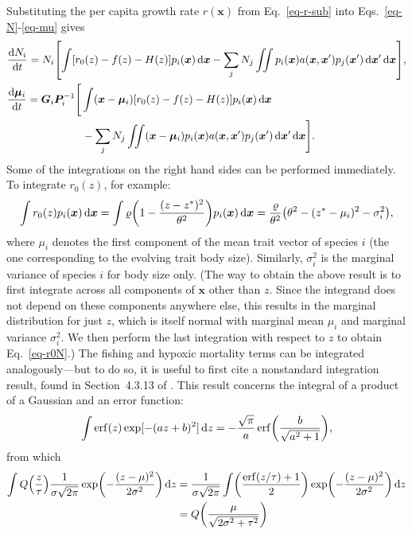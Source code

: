 \documentclass{article}
\newcommand{\mat}[1]{\bm{#1}}
\DeclareMathOperator\erf{erf}
\newcommand{\ud}{\text{d}}
\let\originalleft\left
\let\originalright\right
\renewcommand{\left}{\mathopen{}\mathclose\bgroup\originalleft}
\renewcommand{\right}{\aftergroup\egroup\originalright}
\begin{document}
Substituting the per capita growth rate $r(\mat{x})$ from Eq.~\ref{eq-r-sub} into Eqs.~\ref{eq-N}-\ref{eq-mu} gives
\begin{align}
  \label{eq-n-LV}
  &\frac{\ud N_i}{\ud t}
  = N_i \left[ \int \left[ r_0(z) - f(z) - H(z) \right]
  p_i(\mat{x}) \,\ud \mat{x}
  - \sum_j N_j \iint p_i(\mat{x}) a(\mat{x},\mat{x}')
  p_j(\mat{x}') \,\ud \mat{x}' \,\ud \mat{x} \right] , \\
  \label{eq-mu-LV}
  &\frac{\ud \mat{\mu}_i}{\ud t}
  = \mat{G}_i\mat{P}_i^{-1} \Bigg[ \int (\mat{x} - \mat{\mu}_i)
  \left[ r_0(z) - f(z) - H(z) \right]
  p_i(\mat{x}) \,\ud \mat{x}
  \\ &\qquad\qquad\qquad\quad
  - \sum_j N_j \iint (\mat{x} - \mat{\mu}_i)
  p_i(\mat{x}) a(\mat{x},\mat{x}')
  p_j(\mat{x}')\,\ud\mat{x}'\,\ud\mat{x} \Bigg] . \nonumber
\end{align}
Some of the integrations on the right hand sides can be performed immediately. To integrate $r_0(z)$, for example:
\begin{equation}
  \label{eq-r0N}
  \int r_0(z) p_i(\mat{x}) \,\ud\mat{x}
  = \int \varrho \left( 1 - \frac{(z-z^*)^2}{\theta^{2}} \right)
  p_i(\mat{x}) \,\ud\mat{x}
  = \frac{\varrho}{\theta^2}
  \left(\theta^2 - (z^* - \mu_i)^2 - \sigma_i^2 \right) ,
\end{equation}
where $\mu_i$ denotes the first component of the mean trait vector of species $i$ (the one corresponding to the evolving trait body size). Similarly, $\sigma_i^2$ is the marginal variance of species $i$ for body size only. (The way to obtain the above result is to first integrate across all components of $\mat{x}$ other than $z$. Since the integrand does not depend on these components anywhere else, this results in the marginal distribution for just $z$, which is itself normal with marginal mean $\mu_i$ and marginal variance $\sigma_i^2$. We then perform the last integration with respect to $z$ to obtain Eq.~\ref{eq-r0N}.) The fishing and hypoxic mortality terms can be integrated analogously---but to do so, it is useful to first cite a nonstandard integration result, found in Section~4.3.13 of \citet{NgGeller1968}. This result concerns the integral of a product of a Gaussian and an error function:
\begin{equation}
  \label{eq-NgGeller}
  \int \erf(z) \exp[-(az+b)^2] \,\ud z
  = -\frac{\sqrt{\pi}}{a}
  \erf \left( \frac{b}{\sqrt{a^2 + 1}} \right) ,
\end{equation}
from which
\begin{equation}
  \label{eq-ErfGauss}
  \begin{split}
  \int Q\left(\frac{z}{\tau}\right)
  \frac{1}{\sigma \sqrt{2\pi}}
  \exp\left( -\frac{(z-\mu)^2}{2\sigma^2}\right) \,\ud z
  &= \frac{1}{\sigma \sqrt{2\pi}}
  \int \left(\frac{\erf(z/\tau) + 1}{2} \right)
  \exp\left( -\frac {(z-\mu)^2}{2\sigma^2} \right) \,\ud z
  \\ &= Q\left(\frac{\mu}{\sqrt{2\sigma^2+\tau^2}}\right)
  \end{split}
\end{equation}
\end{document}
